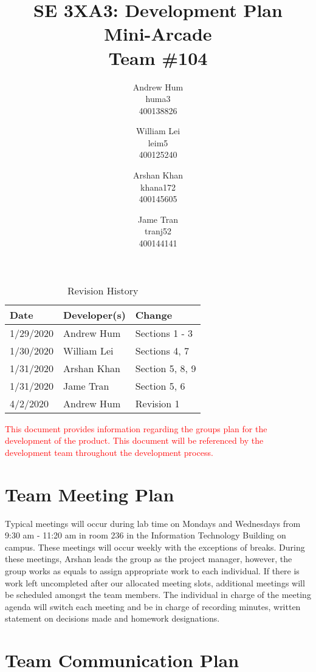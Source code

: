 \documentclass{article}
\title{SE 3XA3: Development Plan\\Mini-Arcade\\Team \#104}
\author{Andrew Hum \\ huma3 \\ 400138826 \and
		William Lei \\ leim5 \\ 400125240 \and
		Arshan Khan \\ khana172 \\ 400145605 \and
		Jame Tran \\ tranj52 \\ 400144141
}
\date{}
\begin{document}
\maketitle

\begin{table}[hp]
\caption{Revision History} \label{TblRevisionHistory}
\begin{tabularx}{\textwidth}{llX}
\toprule
\textbf{Date} & \textbf{Developer(s)} & \textbf{Change}\\
\midrule
1/29/2020 & Andrew Hum & Sections 1 - 3\\
1/30/2020 & William Lei & Sections 4, 7\\
1/31/2020 & Arshan Khan & Section 5, 8, 9 \\
1/31/2020 & Jame Tran & Section 5, 6 \\
4/2/2020 & Andrew Hum & Revision 1\\

\bottomrule
\end{tabularx}
\end{table}

\newpage

\textcolor{red}{This document provides information regarding the groups plan for the development of the product. This document will be referenced by the development team throughout the development process.}

\section{Team Meeting Plan}

Typical meetings will occur during lab time on Mondays and Wednesdays from 9:30 am - 11:20 am in room 236 in the Information Technology Building on campus. These meetings will occur weekly with the exceptions of breaks. During these meetings, Arshan leads the group as the project manager, however, the group works as equals to assign appropriate work to each individual. If there is work left uncompleted after our allocated meeting slots, additional meetings will be scheduled amongst the team members. The individual in charge of the meeting agenda will switch each meeting and be in charge of recording minutes, written statement on decisions made and homework designations.

\section{Team Communication Plan}
\end{document}
